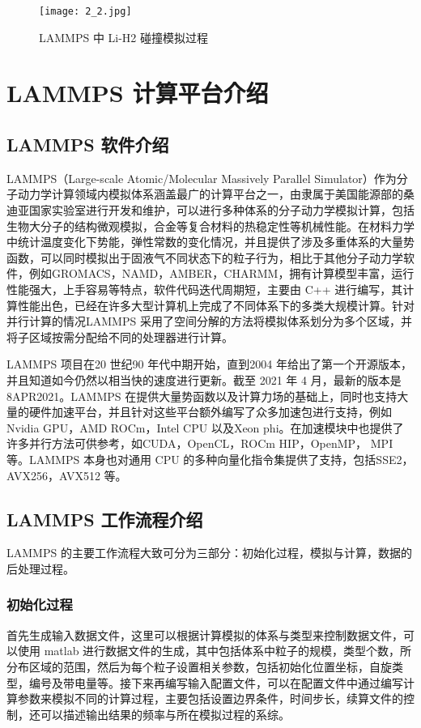  \begin{figure}[h]
  \centering
  \texttt{[image: 2\_2.jpg]}
  \caption{LAMMPS 中 Li-H2 碰撞模拟过程}
\end{figure}

\section{LAMMPS 计算平台介绍}
\subsection{LAMMPS 软件介绍}
LAMMPS（Large-scale Atomic/Molecular Massively Parallel Simulator）作为分子动力学计算领域内模拟体系涵盖最广的计算平台之一，由隶属于美国能源部的桑迪亚国家实验室进行开发和维护，可以进行多种体系的分子动力学模拟计算，包括生物大分子的结构微观模拟，合金等复合材料的热稳定性等机械性能。在材料力学中统计温度变化下势能，弹性常数的变化情况，并且提供了涉及多重体系的大量势函数，可以同时模拟出于固液气不同状态下的粒子行为，相比于其他分子动力学软件，例如GROMACS\cite{berendsen1995gromacs}，NAMD\cite{phillips2005scalable}，AMBER\cite{pearlman1995amber}，CHARMM\cite{brooks1983charmm}，拥有计算模型丰富，运行性能强大，上手容易等特点，软件代码迭代周期短，主要由 C++ 进行编写，其计算性能出色，已经在许多大型计算机上完成了不同体系下的多类大规模计算。针对并行计算的情况LAMMPS 采用了空间分解的方法将模拟体系划分为多个区域，并将子区域按需分配给不同的处理器进行计算。

LAMMPS 项目在20 世纪90 年代中期开始，直到2004 年给出了第一个开源版本，并且知道如今仍然以相当快的速度进行更新。截至 2021 年 4 月，最新的版本是8APR2021。LAMMPS 在提供大量势函数以及计算力场的基础上，同时也支持大量的硬件加速平台，并且针对这些平台额外编写了众多加速包进行支持，例如Nvidia GPU\cite{hong2009analytical}，AMD ROCm\cite{kuznetsov2019porting}，Intel CPU 以及Xeon phi\cite{chrysos2014intel}。在加速模块中也提供了许多并行方法可供参考，如CUDA，OpenCL，ROCm HIP，OpenMP， MPI 等。LAMMPS 本身也对通用 CPU 的多种向量化指令集提供了支持，包括SSE2\cite{bik2002automatic}，AVX256\cite{lim2018implementation}，AVX512\cite{cornea2015intel} 等。

\subsection{LAMMPS 工作流程介绍}
LAMMPS 的主要工作流程大致可分为三部分：初始化过程，模拟与计算，数据的后处理过程。

\subsubsection{初始化过程}
首先生成输入数据文件，这里可以根据计算模拟的体系与类型来控制数据文件，可以使用 matlab 进行数据文件的生成，其中包括体系中粒子的规模，类型个数，所分布区域的范围，然后为每个粒子设置相关参数，包括初始化位置坐标，自旋类型，编号及带电量等。接下来再编写输入配置文件，可以在配置文件中通过编写计算参数来模拟不同的计算过程，主要包括设置边界条件，时间步长，续算文件的控制，还可以描述输出结果的频率与所在模拟过程的系综。

